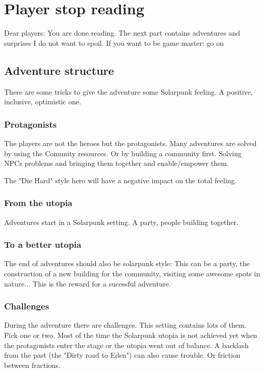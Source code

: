 \chapter{Player stop reading}

Dear players: You are done reading. The next part contains adventures and surprises I do not want to spoil. If you want to be game master: go on


\section{Adventure structure}

There are some tricks to give the adventure some Solarpunk feeling. A positive, inclusive, optimistic one.

\subsection{Protagonists}

The players are not the heroes but the protagonists. Many adventures are solved by using the Comunity resources.
Or by building a community first. Solving NPCs problems and bringing them together and enable/empower them.

The "Die Hard" style hero will have a negative impact on the total feeling.

\subsection{From the utopia}

Adventures start in a Solarpunk setting. A party, people building together.

\subsection{To a better utopia}

The end of adventures should also be solarpunk style: This can be a party, the construction of a new building for the community, visiting some awesome spots in nature... This is the reward for a sucessful adventure.

\subsection{Challenges}

During the adventure there are challenges. This setting contains lots of them. Pick one or two. Most of the time the Solarpunk utopia is not achieved yet when the protagonists enter the stage or the utopia went out of balance. A backlash from the past (the "Dirty road to Eden") can also cause trouble. Or friction between fractions.

